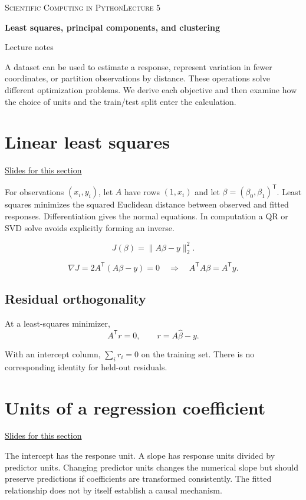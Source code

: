 \documentclass[11pt,letterpaper]{article}
\theoremstyle{definition}\newtheorem{definition}{Definition}\newtheorem{example}{Example}
\numberwithin{equation}{section}
\begin{document}
{\small\scshape Scientific Computing in Python\hfill Lecture 5}\par\medskip
{\raggedright{}\LARGE\bfseries\color{ink} Least squares, principal components, and clustering\par}\medskip
{\small Lecture notes}\par\bigskip
A dataset can be used to estimate a response, represent variation in fewer coordinates, or partition observations by distance. These operations solve different optimization problems. We derive each objective and then examine how the choice of units and the train/test split enter the calculation.

\section{Linear least squares}
\hypertarget{note-linear-least-squares}{}\label{note:linear-least-squares}
{\small \href{slides.html\#frame=linear-least-squares\&step=1}{Slides for this section}}\par
For observations $(x_i,y_i)$, let $A$ have rows $(1,x_i)$ and let $\beta=(\beta_0,\beta_1)^{\mathsf T}$. Least squares minimizes the squared Euclidean distance between observed and fitted responses. Differentiation gives the normal equations. In computation a QR or SVD solve avoids explicitly forming an inverse.

\[
J(\beta)=\|A\beta-y\|_2^2.
\]

\[
\nabla J=2A^{\mathsf T}(A\beta-y)=0
\quad\Longrightarrow\quad A^{\mathsf T}A\beta=A^{\mathsf T}y.
\]

\subsection*{Residual orthogonality}
At a least-squares minimizer,
\[
A^{\mathsf T}r=0,\qquad r=A\widehat\beta-y.
\]

With an intercept column, $\sum_i r_i=0$ on the training set. There is no corresponding identity for held-out residuals.
\section{Units of a regression coefficient}
\hypertarget{note-units-of-a-regression-coefficient}{}\label{note:units-of-a-regression-coefficient}
{\small \href{slides.html\#frame=units-of-a-regression-coefficient\&step=1}{Slides for this section}}\par
The intercept has the response unit. A slope has response units divided by predictor units. Changing predictor units changes the numerical slope but should preserve predictions if coefficients are transformed consistently. The fitted relationship does not by itself establish a causal mechanism.
\end{document}
